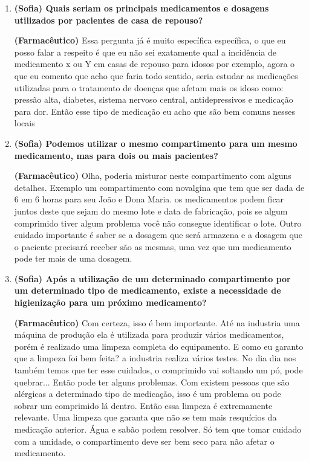 \begin{apendicesenv}
\begin{enumerate}
\item \textbf{(Sofia) Quais seriam os principais medicamentos e dosagens utilizados por pacientes de casa de repouso?}

\textbf{(Farmacêutico)} Essa pergunta já é muito específica específica, o que eu posso falar a respeito é que eu não sei exatamente qual a incidência de medicamento x ou Y em casas de repouso para idosos por exemplo, agora o que eu comento que acho que faria todo sentido, seria estudar as medicações utilizadas para o tratamento de doenças que afetam mais os idoso como: pressão alta, diabetes, sistema nervoso central, antidepressivos e medicação para dor. Então esse tipo de medicação eu acho que são bem comuns nesses locais


\item \textbf{(Sofia) Podemos utilizar o mesmo compartimento para um mesmo medicamento, mas para dois ou mais pacientes?}

\textbf{(Farmacêutico)} Olha, poderia misturar neste compartimento com alguns detalhes. Exemplo um compartimento com novalgina que tem que ser dada de 6 em 6 horas para seu João e Dona Maria. os medicamentos podem ficar juntos deste que sejam do mesmo lote e data de fabricação, pois se algum comprimido tiver algum problema você não consegue identificar o lote. Outro cuidado importante é saber se a dosagem que será armazena e a dosagem que o paciente precisará receber são as mesmas, uma vez que um medicamento pode ter mais de uma dosagem. 

\item \textbf{(Sofia) Após a utilização de um determinado compartimento por um determinado tipo de medicamento, existe a necessidade de higienização para um próximo medicamento?}

\textbf{(Farmacêutico)} Com certeza, isso é bem importante. Até na industria uma máquina de produção ela é utilizada para produzir vários medicamentos, porém é realizado uma limpeza completa do equipamento. E como eu garanto que a limpeza foi bem feita? a industria realiza vários testes. No dia dia nos também temos que ter esse cuidados, o comprimido vai soltando um pó, pode quebrar... Então pode ter alguns problemas. Com existem pessoas que são alérgicas a determinado tipo de medicação, isso é um problema ou pode sobrar um comprimido lá dentro. Então essa limpeza é extremamente relevante. Uma limpeza que garanta que não se tem mais resquícios da medicação anterior. Água e sabão podem resolver. Só tem que tomar cuidado com a umidade, o compartimento deve ser bem seco para não afetar o medicamento.


\end{enumerate}
\end{apendicesenv}

